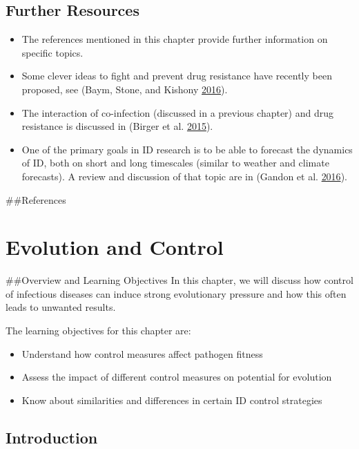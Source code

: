 \documentclass[]{book}
\providecommand{\tightlist}{%
  \setlength{\itemsep}{0pt}\setlength{\parskip}{0pt}}
\theoremstyle{definition}
\theoremstyle{definition}
\theoremstyle{definition}
\theoremstyle{remark}
\begin{document}
\hypertarget{further-resources-7}{%
\section{Further Resources}\label{further-resources-7}}

\begin{itemize}
\tightlist
\item
  The references mentioned in this chapter provide further information
  on specific topics.
\item
  Some clever ideas to fight and prevent drug resistance have recently
  been proposed, see (Baym, Stone, and Kishony
  \protect\hyperlink{ref-baym16}{2016}).
\item
  The interaction of co-infection (discussed in a previous chapter) and
  drug resistance is discussed in (Birger et al.
  \protect\hyperlink{ref-birger15}{2015}).
\item
  One of the primary goals in ID research is to be able to forecast the
  dynamics of ID, both on short and long timescales (similar to weather
  and climate forecasts). A review and discussion of that topic are in
  (Gandon et al. \protect\hyperlink{ref-gandon16}{2016}).
\end{itemize}

\#\#References

\hypertarget{evolution-and-control}{%
\chapter{Evolution and Control}\label{evolution-and-control}}

\#\#Overview and Learning Objectives In this chapter, we will discuss
how control of infectious diseases can induce strong evolutionary
pressure and how this often leads to unwanted results.

The learning objectives for this chapter are:

\begin{itemize}
\tightlist
\item
  Understand how control measures affect pathogen fitness
\item
  Assess the impact of different control measures on potential for
  evolution
\item
  Know about similarities and differences in certain ID control
  strategies
\end{itemize}

\hypertarget{introduction-9}{%
\section{Introduction}\label{introduction-9}}
\end{document}
